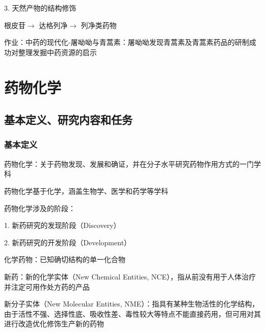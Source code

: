 3. 天然产物的结构修饰
\begin{eg}
    根皮苷$\to $ 达格列净$\to $ 列净类药物
\end{eg}
作业：中药的现代化-屠呦呦与青蒿素：屠呦呦发现青蒿素及青蒿素药品的研制成功对整理发掘中药资源的启示

\section{药物化学}%
\label{sec:药物化学}
\subsection{基本定义、研究内容和任务}%
\label{sub:基本定义、研究内容和任务}
\subsubsection{基本定义}%
\label{subsub:基本定义}
\begin{defi}
    药物化学：关于药物发现、发展和确证，并在分子水平研究药物作用方式的一门学科

    药物化学基于化学，涵盖生物学、医学和药学等学科
\end{defi}
药物化学涉及的阶段：

1. 新药研究的发现阶段（Discovery）

2. 新药研究的开发阶段（Development）
\begin{defi}
    化学药物：已知确切结构的单一化合物

    新药：新的化学实体（New Chemical Entities, NCE），指从前没有用于人体治疗并注定可用作处方药的产品

    新分子实体（New Molecular Entities, NME）：指具有某种生物活性的化学结构，由于活性不强、选择性底、吸收性差、毒性较大等特点不能直接药用，但可用对其进行改造优化修饰生产新的药物
\end{defi}

